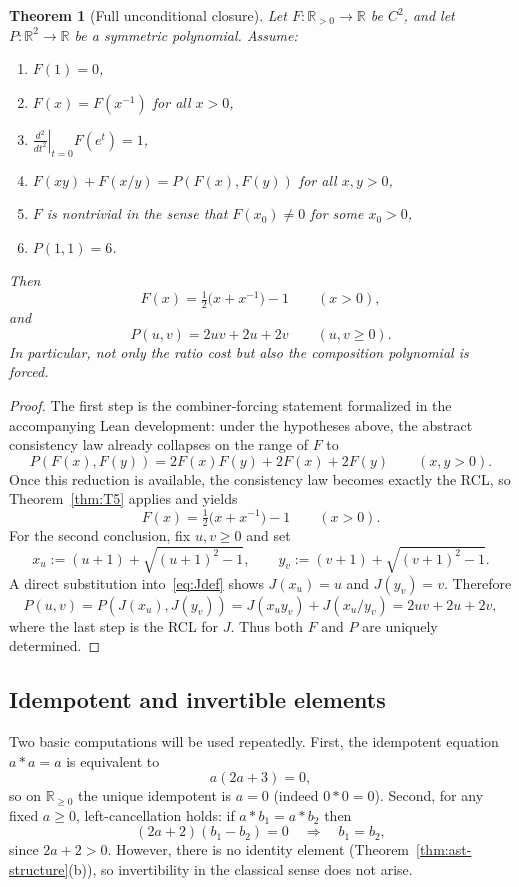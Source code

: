 \documentclass[11pt,reqno]{amsart}
\theoremstyle{plain}
\newtheorem{theorem}{Theorem}[section]
\theoremstyle{definition}
\theoremstyle{remark}
\newcommand{\Jcost}{J}
\newcommand{\RR}{\mathbb{R}}
\newcommand{\Rp}{\RR_{>0}}
\newcommand{\1}{\mathbf{1}}
\begin{document}
{\color{paperblue}
\begin{theorem}[Full unconditional closure]\label{thm:full-unconditional}
Let \(F:\Rp\to\RR\) be \(C^2\), and let \(P:\RR^2\to\RR\) be a symmetric polynomial.
Assume:
\begin{enumerate}[nosep,label=\textup{(\roman*)}]
\item \(F(1)=0\),
\item \(F(x)=F(x^{-1})\) for all \(x>0\),
\item \(\left.\frac{d^2}{dt^2}\right|_{t=0}F(e^t)=1\),
\item \(F(xy)+F(x/y)=P(F(x),F(y))\) for all \(x,y>0\),
\item \(F\) is nontrivial in the sense that \(F(x_0)\neq 0\) for some \(x_0>0\),
\item \(P(1,1)=6\).
\end{enumerate}
Then
\[
F(x)=\tfrac12\bigl(x+x^{-1}\bigr)-1 \qquad (x>0),
\]
and
\[
P(u,v)=2uv+2u+2v \qquad (u,v\ge 0).
\]
In particular, not only the ratio cost but also the composition polynomial is forced.
\end{theorem}

\begin{proof}
The first step is the combiner-forcing statement formalized in the accompanying Lean development:
under the hypotheses above, the abstract consistency law already collapses on the range of \(F\) to
\[
P(F(x),F(y))=2F(x)F(y)+2F(x)+2F(y)\qquad (x,y>0).
\]
Once this reduction is available, the consistency law becomes exactly the RCL, so Theorem~\ref{thm:T5}
applies and yields
\[
F(x)=\tfrac12\bigl(x+x^{-1}\bigr)-1 \qquad (x>0).
\]
For the second conclusion, fix \(u,v\ge 0\) and set
\[
x_u:=(u+1)+\sqrt{(u+1)^2-1},\qquad
y_v:=(v+1)+\sqrt{(v+1)^2-1}.
\]
A direct substitution into~\eqref{eq:Jdef} shows \(\Jcost(x_u)=u\) and \(\Jcost(y_v)=v\). Therefore
\[
P(u,v)=P(\Jcost(x_u),\Jcost(y_v))
=\Jcost(x_u y_v)+\Jcost(x_u/y_v)
=2uv+2u+2v,
\]
where the last step is the RCL for \(\Jcost\). Thus both \(F\) and \(P\) are uniquely determined.
\end{proof}
}

\subsection{Idempotent and invertible elements}\label{ssec:idemp-inv}
Two basic computations will be used repeatedly. First, the idempotent equation
\(a\ast a=a\) is equivalent to
\begin{equation}\label{eq:idempotent}
a(2a+3)=0,
\end{equation}
so on \(\RR_{\ge0}\) the unique idempotent is \(a=0\) (indeed \(0\ast0=0\)).
Second, for any fixed \(a\ge0\), left-cancellation holds: if \(a\ast b_1=a\ast b_2\) then
\begin{equation}\label{eq:left-cancel}
(2a+2)(b_1-b_2)=0\quad\Rightarrow\quad b_1=b_2,
\end{equation}
since \(2a+2>0\). However, there is no identity element (Theorem~\ref{thm:ast-structure}(b)),
so invertibility in the classical sense does not arise.
\end{document}
